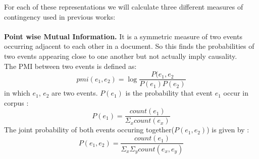 \documentclass[11pt]{article}
\begin{document}
For each of these representations we will calculate three different measures of contingency used in previous works: \\
\smallskip \\

{\bf Point wise Mutual Information.} It is a symmetric measure of two events occurring adjacent to each other in a document. So this finds the probabilities of two events appearing close to one another but not actually imply causality\cite{nec,cloze}. \\
The PMI between two events is defined as: 
\begin{equation}\label{pmi}
pmi(e_1,e_2) = \log\frac{P(e_1,e_2}{P(e_1)P(e_2)}
\end{equation}
in which $e_1$, $e_2$ are two events. $P(e_1)$ is the probability that event $e_1$ occur in corpus : 
\begin{equation}
P(e_1) = \frac{count(e_1)}{\Sigma_x count(e_x)}
\end{equation}
The joint probability of both events occuring together($P(e_1,e_2)$) is given by :
\begin{equation}
P(e_1,e_2) = \frac{count(e_1)}{\Sigma_x \Sigma_y count(e_x,e_y)}
\end{equation}
\smallskip \\
\end{document}
